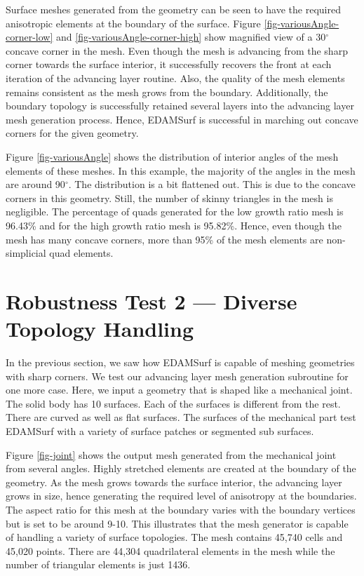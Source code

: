 Surface meshes generated from the geometry can be seen to have the required anisotropic elements at the boundary of the surface. Figure \ref{fig-variousAngle-corner-low} and \ref{fig-variousAngle-corner-high} show magnified view of a 30$^\circ$ concave corner in the mesh. Even though the mesh is advancing from the sharp corner towards the surface interior, it successfully recovers the front at each iteration of the advancing layer routine. Also, the quality of the mesh elements remains consistent as the mesh grows from the boundary. Additionally, the boundary topology is successfully retained several layers into the advancing layer mesh generation process. Hence, EDAMSurf is successful in marching out concave corners for the given geometry.

Figure \ref{fig-variousAngle} shows the distribution of interior angles of the mesh elements of these meshes. In this example, the majority of the angles in the mesh are around 90$^\circ$. The distribution is a bit flattened out. This is due to the concave corners in this geometry. Still, the number of skinny triangles in the mesh is negligible. The percentage of quads generated for the low growth ratio mesh is 96.43\% and for the high growth ratio mesh is 95.82\%. Hence, even though the mesh has many concave corners, more than 95\% of the mesh elements are non-simplicial quad elements.

\section{Robustness Test 2 --- Diverse Topology Handling}

In the previous section, we saw how EDAMSurf is capable of meshing geometries with sharp corners. We test our advancing layer mesh generation subroutine for one more case. Here, we input a geometry that is shaped like a mechanical joint. The solid body has 10 surfaces. Each of the surfaces is different from the rest. There are curved as well as flat surfaces. The surfaces of the mechanical part test EDAMSurf with a variety of surface patches or segmented sub surfaces.

Figure \ref{fig-joint} shows the output mesh generated from the mechanical joint from several angles. Highly stretched elements are created at the boundary of the geometry. As the mesh grows towards the surface interior, the advancing layer grows in size, hence generating the required level of anisotropy at the boundaries. The aspect ratio for this mesh at the boundary varies with the boundary vertices but is set to be around 9-10. This illustrates that the mesh generator is capable of handling a variety of surface topologies. The mesh contains 45,740 cells and 45,020 points. There are 44,304 quadrilateral elements in the mesh while the number of triangular elements is just 1436.

